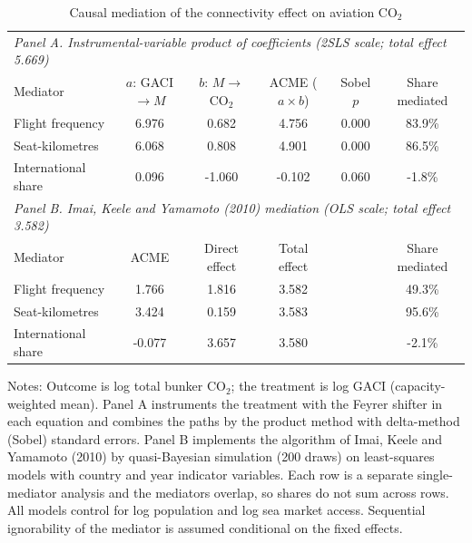 \documentclass[11pt]{article}
\begin{document}
\begin{table}[htbp]
\centering
\begin{threeparttable}
\caption{Causal mediation of the connectivity effect on aviation CO$_2$}
\label{tab:mediation}
\footnotesize
\begin{tabular}{lccccc}
\toprule
\multicolumn{6}{l}{\textit{Panel A. Instrumental-variable product of coefficients (2SLS scale; total effect 5.669)}} \\
Mediator & $a$: GACI$\rightarrow M$ & $b$: $M\rightarrow$CO$_2$ & ACME ($a\times b$) & Sobel $p$ & Share mediated \\
\midrule
  Flight frequency & 6.976 & 0.682 & 4.756 & 0.000 & 83.9\% \\
  Seat-kilometres & 6.068 & 0.808 & 4.901 & 0.000 & 86.5\% \\
  International share & 0.096 & -1.060 & -0.102 & 0.060 & -1.8\% \\
\midrule
\multicolumn{6}{l}{\textit{Panel B. Imai, Keele and Yamamoto (2010) mediation (OLS scale; total effect 3.582)}} \\
Mediator & ACME & Direct effect & Total effect & & Share mediated \\
\midrule
  Flight frequency & 1.766 & 1.816 & 3.582 & & 49.3\% \\
  Seat-kilometres & 3.424 & 0.159 & 3.583 & & 95.6\% \\
  International share & -0.077 & 3.657 & 3.580 & & -2.1\% \\
\bottomrule
\end{tabular}
\begin{tablenotes}[flushleft]
\footnotesize
\item Notes: Outcome is log total bunker CO$_2$; the treatment is log GACI (capacity-weighted mean). Panel A instruments the treatment with the Feyrer shifter in each equation and combines the paths by the product method with delta-method (Sobel) standard errors. Panel B implements the algorithm of Imai, Keele and Yamamoto (2010) by quasi-Bayesian simulation (200 draws) on least-squares models with country and year indicator variables. Each row is a separate single-mediator analysis and the mediators overlap, so shares do not sum across rows. All models control for log population and log sea market access. Sequential ignorability of the mediator is assumed conditional on the fixed effects.
\end{tablenotes}
\end{threeparttable}
\end{table}
\end{document}
